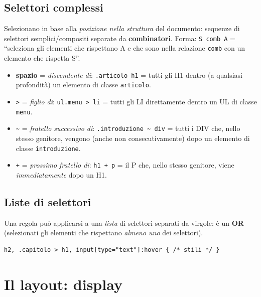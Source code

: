 \subsection{Selettori complessi}
Selezionano in base alla \emph{posizione nella struttura} del documento: sequenze di selettori
semplici/compositi separate da \textbf{combinatori}. Forma: \texttt{S comb A} = ``seleziona
gli elementi che rispettano A e che sono nella relazione \texttt{comb} con un elemento che
rispetta S''.
\begin{itemize}
  \item \textbf{spazio} = \emph{discendente di}: \texttt{.articolo h1} = tutti gli H1
        dentro (a qualsiasi profondit\`a) un elemento di classe \texttt{articolo}.
  \item \texttt{>} = \emph{figlio di}: \texttt{ul.menu > li} = tutti gli LI direttamente
        dentro un UL di classe \texttt{menu}.
  \item \texttt{\textasciitilde} = \emph{fratello successivo di}:
        \texttt{.introduzione \textasciitilde\ div} = tutti i DIV che, nello stesso genitore,
        vengono (anche non consecutivamente) dopo un elemento di classe
        \texttt{introduzione}.
  \item \texttt{+} = \emph{prossimo fratello di}: \texttt{h1 + p} = il P che, nello stesso
        genitore, viene \emph{immediatamente} dopo un H1.
\end{itemize}

\subsection{Liste di selettori}
Una regola pu\`o applicarsi a una \emph{lista} di selettori separati da virgole: \`e un
\textbf{OR} (selezionati gli elementi che rispettano \emph{almeno uno} dei selettori).
\begin{lstlisting}[language=HTMLCSS]
h2, .capitolo > h1, input[type="text"]:hover { /* stili */ }
\end{lstlisting}

\section{Il layout: display}

